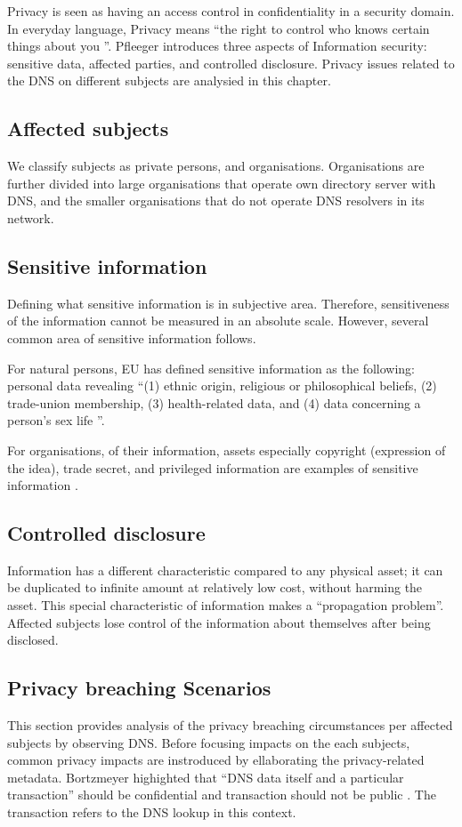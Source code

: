 Privacy is seen as having an access control in confidentiality in a security domain.
In everyday language, Privacy means ``the right to control who knows certain things about you \cite{securityincomputing}''.
Pfleeger introduces three aspects of Information security: sensitive data, affected parties, and controlled disclosure.
Privacy issues related to the DNS on different subjects are analysied in this chapter.

\subsection{Affected subjects}
We classify subjects as private persons, and organisations. Organisations are further divided into large organisations that operate own directory server with DNS, and the smaller organisations that do not operate DNS resolvers in its network.

\subsection{Sensitive information}\label{sensitiveinformation}
Defining what sensitive information is in subjective area.
Therefore, sensitiveness of the information cannot be measured in an absolute scale. However, several common area of sensitive information follows.

For natural persons, EU has defined sensitive information as the following: personal data revealing ``(1) ethnic origin, religious or philosophical beliefs, (2) trade-union membership, (3) health-related data, and (4) data concerning a person's sex life \cite{GDPR}''.

For organisations, of their information, assets especially copyright (expression of the idea), trade secret, and privileged information are examples of sensitive information \cite{securityincomputing}.

\subsection{Controlled disclosure}
Information has a different characteristic compared to any physical asset; it can be duplicated to infinite amount at relatively low cost, without harming the asset.
This special characteristic of information makes a ``propagation problem''.
Affected subjects lose control of the information about themselves after being disclosed.

\subsection{Privacy breaching Scenarios}
This section provides analysis of the privacy breaching circumstances per affected subjects by observing DNS. Before focusing impacts on the each subjects, common privacy impacts are instroduced by ellaborating the privacy-related metadata.
Bortzmeyer highighted that ``DNS data itself and a particular transaction'' should be confidential and transaction should not be public \cite{rfc7626}. The transaction refers to the DNS lookup in this context.

